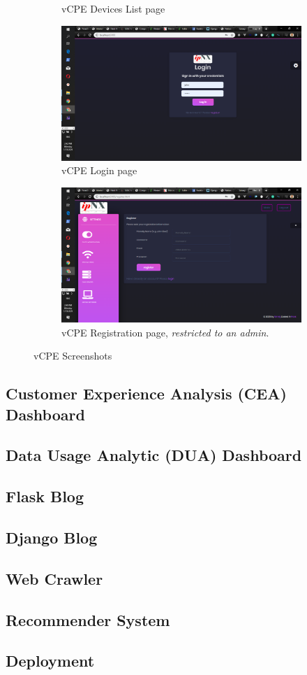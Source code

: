 \begin{figure}[h!]
\begin{subfigure}[b]{0.45\textwidth}
	\caption{\ac{vCPE}  Devices List page}
\end{subfigure}
\hfill
\begin{subfigure}[b]{0.45\textwidth}
	\centering
	\includegraphics[width=\textwidth]{./vcpelogin}
	\caption{\ac{vCPE} Login page}
\end{subfigure}
\hfill
\begin{subfigure}[b]{0.45\textwidth}
	\centering
	\includegraphics[width=\textwidth]{./vcperegister}
	\caption{\ac{vCPE} Registration page, \textit{restricted to an admin}.}
\end{subfigure}
	\caption{\ac{vCPE} Screenshots}
\end{figure}
\subsection{Customer Experience Analysis (CEA) Dashboard}
\subsection{Data Usage Analytic (DUA) Dashboard}
\subsection{Flask Blog}
\subsection{Django Blog}
\subsection{Web Crawler}
\subsection{Recommender System}
\subsection{Deployment}

